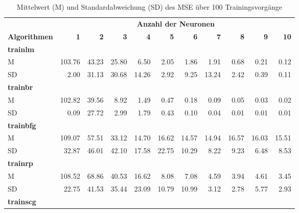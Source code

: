 \begin{table}[htbp]
	\centering
	\caption{Mittelwert (M) und Standardabweichung (SD) des MSE über 100 Trainingsvorgänge}
	\begin{adjustbox}{width=\textwidth}
		
		\begin{tabular}{|l|r|r|r|r|r|r|r|r|r|r|}
			\toprule
			        & \multicolumn{10}{c|}{\textbf{Anzahl der Neuronen}} \\
			\textbf{Algorithmen} & \textbf{1} & \textbf{2} & \textbf{3} & \textbf{4} & \textbf{5} & \textbf{6} & \textbf{7} & \textbf{8} & \textbf{9} & \textbf{10} \\
			\midrule
			\textbf{trainlm} &       &       &       &       &       &       &       &       &       &  \\
			\midrule
			M     & 103.76 & 43.23 & 25.80 & 6.50  & 2.05  & 1.86  & 1.91  & 0.68  & 0.21  & 0.12 \\
			\midrule
			SD    & 2.00  & 31.13 & 30.68 & 14.26 & 2.92  & 9.25  & 13.24 & 2.42  & 0.39  & 0.11 \\
			\midrule
			\textbf{trainbr} &       &       &       &       &       &       &       &       &       &  \\
			\midrule
			M     & 102.82 & 39.56 & 8.92  & 1.49  & 0.47  & 0.18  & 0.09  & 0.05  & 0.03  & 0.02 \\
			\midrule
			SD    & 0.09  & 27.72 & 2.99  & 1.79  & 0.43  & 0.10  & 0.04  & 0.01  & 0.01  & 0.01 \\
			\midrule
			\textbf{trainbfg} &       &       &       &       &       &       &       &       &       &  \\
			\midrule
			M     & 109.07 & 57.51 & 33.12 & 14.70 & 16.62 & 14.57 & 14.94 & 16.57 & 16.03 & 15.51 \\
			\midrule
			SD    & 32.87 & 46.01 & 42.10 & 17.58 & 22.75 & 10.29 & 8.22  & 9.23  & 6.48  & 8.53 \\
			\midrule
			\textbf{trainrp} &       &       &       &       &       &       &       &       &       &  \\
			\midrule
			M     & 108.52 & 68.86 & 40.53 & 16.62 & 8.08  & 7.08  & 4.59  & 3.94  & 4.61  & 3.45 \\
			\midrule
			SD    & 22.75 & 41.53 & 35.44 & 23.09 & 10.79 & 10.99 & 3.12  & 2.78  & 5.77  & 2.93 \\
			\midrule
			\textbf{trainscg} &       &       &       &       &       &       &       &       &       &  \\

\end{tabular}
\end{adjustbox}
\end{table}
